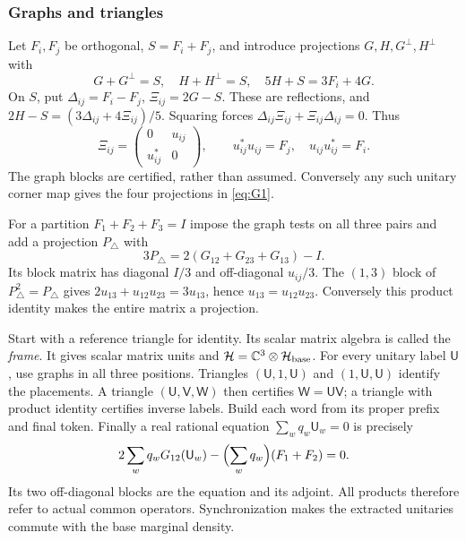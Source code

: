 \subsubsection{Graphs and triangles}
Let $F_i,F_j$ be orthogonal, $S=F_i+F_j$, and introduce projections $G,H,G^\perp,H^\perp$ with
\begin{equation}\label{eq:G1}
 G+G^\perp=S,\quad H+H^\perp=S,\quad 5H+S=3F_i+4G.
\end{equation}
On $S$, put $\Delta_{ij}=F_i-F_j$, $\Xi_{ij}=2G-S$. These are reflections, and $2H-S=(3\Delta_{ij}+4\Xi_{ij})/5$. Squaring forces $\Delta_{ij}\Xi_{ij}+\Xi_{ij}\Delta_{ij}=0$. Thus
\[
 \Xi_{ij}=\begin{pmatrix}0&u_{ij}\\u_{ij}^*&0\end{pmatrix},\qquad
 u_{ij}^*u_{ij}=F_j,\quad u_{ij}u_{ij}^*=F_i.
\]
The graph blocks are certified, rather than assumed. Conversely any such unitary corner map gives the four projections in \eqref{eq:G1}.

For a partition $F_1+F_2+F_3=I$ impose the graph tests on all three pairs and add a projection $P_\triangle$ with
\begin{equation}\label{eq:G2}
 3P_\triangle=2(G_{12}+G_{23}+G_{13})-I.
\end{equation}
Its block matrix has diagonal $I/3$ and off-diagonal $u_{ij}/3$. The $(1,3)$ block of $P_\triangle^2=P_\triangle$ gives $2u_{13}+u_{12}u_{23}=3u_{13}$, hence $u_{13}=u_{12}u_{23}$. Conversely this product identity makes the entire matrix a projection.

Start with a reference triangle for identity. Its scalar matrix algebra is called the \emph{frame}. It gives scalar matrix units and $\mathcal H=\mathbb C^3\otimes\mathcal H_{\rm base}$. For every unitary label $\mathsf U$, use graphs in all three positions. Triangles $(\mathsf U,1,\mathsf U)$ and $(1,\mathsf U,\mathsf U)$ identify the placements. A triangle $(\mathsf U,\mathsf V,\mathsf W)$ then certifies $\mathsf W=\mathsf U\mathsf V$; a triangle with product identity certifies inverse labels. Build each word from its proper prefix and final token. Finally a real rational equation $\sum_wq_w\mathsf U_w=0$ is precisely
\begin{equation}\label{eq:G3}
 2\sum_wq_wG_{12}(\mathsf U_w)-\Bigl(\sum_wq_w\Bigr)(F_1+F_2)=0.
\end{equation}
Its two off-diagonal blocks are the equation and its adjoint. All products therefore refer to actual common operators. Synchronization makes the extracted unitaries commute with the base marginal density.

